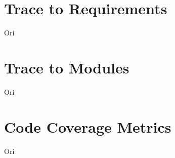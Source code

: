 \documentclass[12pt, titlepage]{article}
\begin{document}
\section{Trace to Requirements}
	Ori

\section{Trace to Modules}		
	Ori

\section{Code Coverage Metrics}
	Ori




\end{document}

